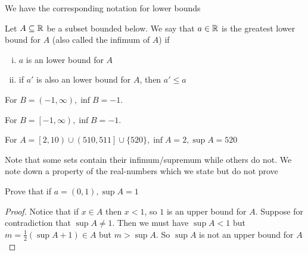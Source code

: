 We have the corresponding notation for lower bounds

\begin{definition}
Let $A \subseteq \mathbb R$ be a subset bounded below. 
We say that $a\in\mathbb R$ is the greatest lower bound for $A$ (also called the infimum of $A$) if
\begin{enumerate}[(i)]
    \item $a$ is an lower bound for $A$
    \item if $a'$ is also an lower bound for $A$, then $a' \leq a$
\end{enumerate}
\end{definition}

For $B=\left(-1,\infty\right), \inf B = -1$.

For $B=\left[-1,\infty\right), \inf B = -1$.

For $A=\left[2,10\right) \cup \left(510,511\right] \cup \{520\}, \inf A = 2, \sup A = 520$

Note that some sets contain their infimum/supremum while others do not.
We note down a property of the real-numbers which we state but do not prove

\begin{example*}
Prove that if $a = \left(0,1\right), \sup A = 1$
\end{example*}

\begin{proof}
    Notice that if $x\in A$ then $x < 1$, so $1$ is an upper bound for $A$.
    Suppose for contradiction that $\sup A \neq 1$.
    Then we must have $\sup A < 1$ but $m=\frac{1}{2}(\sup A + 1) \in A$ but $m > \sup A$.
    So $\sup A$ is not an upper bound for $A$
\end{proof}
